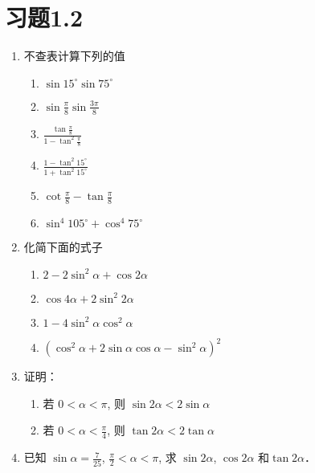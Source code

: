 \section*{习题1.2}
\begin{enumerate}
    \item 不查表计算下列的值
\begin{multicols}{2}
\begin{enumerate}
    \item $\sin 15^{\circ} \sin 75^{\circ}$
    \item $\sin \frac{\pi}{8} \sin \frac{3 \pi}{8}$
    \item $\frac{\tan\frac{\pi}{8}}{1-\tan^2\frac{\pi}{8}}$
    \item $\frac{1-\tan^2 15^{\circ}}{1+\tan^2 15^{\circ}}$
    \item $\cot\frac{\pi}{8}-\tan\frac{\pi}{8}$
    \item $\sin^{4} 105^{\circ}+\cos^{4} 75^{\circ}$
\end{enumerate}
\end{multicols}

\item 化简下面的式子
\begin{multicols}{2}
    \begin{enumerate}
        \item  $2-2 \sin ^{2} \alpha+\cos 2 \alpha$
        \item  $\cos 4 \alpha+2 \sin ^{2} 2 \alpha$
        \item $1-4 \sin ^{2} \alpha \cos ^{2} \alpha$
\item $\left(\cos ^{2} \alpha+2 \sin \alpha \cos \alpha-\sin ^{2} \alpha\right)^{2}$
\end{enumerate}
\end{multicols}

\item 证明：
\begin{enumerate}
    \item 若 $0<\alpha<\pi$, 则 $\sin 2 \alpha<2 \sin \alpha$
    \item 若 $0<\alpha<\frac{\pi}{4}$, 则 $\tan 2 \alpha<2\tan  \alpha$
\end{enumerate}

\item  已知 $\sin \alpha=\frac{7}{25}$, $\frac{\pi}{2}<\alpha<\pi$,
求 $\sin 2 \alpha$, $\cos 2 \alpha$ 和$\tan 2 \alpha$．


\end{enumerate}
